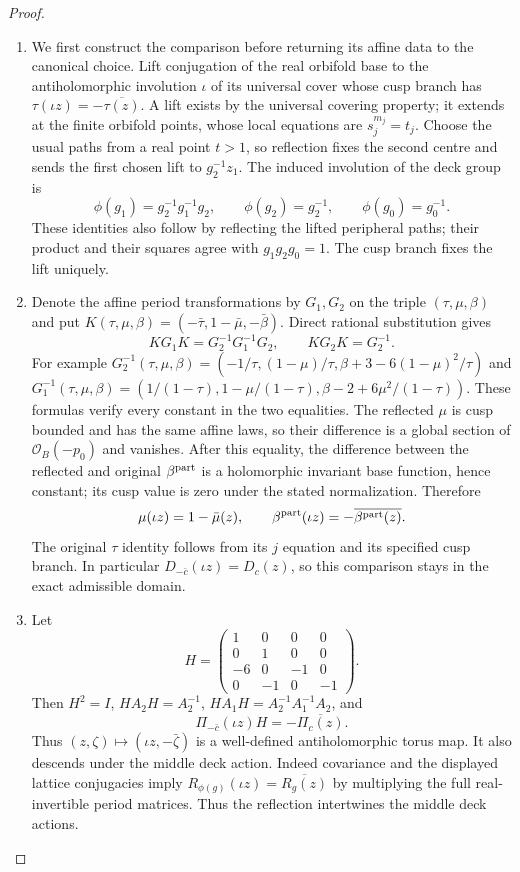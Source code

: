 \begin{proof}
\begin{enumerate}[label=\arabic*.,leftmargin=*]
\item We first construct the comparison before returning its affine data to the canonical choice. Lift conjugation of the real orbifold base to the antiholomorphic involution $\iota$ of its universal cover whose cusp branch has $\tau(\iota z)=-\overline{\tau(z)}$. A lift exists by the universal covering property; it extends at the finite orbifold points, whose local equations are $s_j^{m_j}=t_j$. Choose the usual paths from a real point $t>1$, so reflection fixes the second centre and sends the first chosen lift to $g_2^{-1}z_1$. The induced involution of the deck group is
\[
 \phi(g_1)=g_2^{-1}g_1^{-1}g_2,\qquad
 \phi(g_2)=g_2^{-1},\qquad \phi(g_0)=g_0^{-1}.
\]
These identities also follow by reflecting the lifted peripheral paths; their product and their squares agree with $g_1g_2g_0=1$. The cusp branch fixes the lift uniquely.

\item Denote the affine period transformations by $G_1,G_2$ on the triple $(\tau,\mu,\beta)$ and put $K(\tau,\mu,\beta)=(-\bar\tau,1-\bar\mu,-\bar\beta)$. Direct rational substitution gives
\[
 KG_1K=G_2^{-1}G_1^{-1}G_2,\qquad KG_2K=G_2^{-1}.
\]
For example $G_2^{-1}(\tau,\mu,\beta)=(-1/\tau,(1-\mu)/\tau,\beta+3-6(1-\mu)^2/\tau)$ and
$G_1^{-1}(\tau,\mu,\beta)=(1/(1-\tau),1-\mu/(1-\tau),\beta-2+6\mu^2/(1-\tau))$. These formulas verify every constant in the two equalities. The reflected $\mu$ is cusp bounded and has the same affine laws, so their difference is a global section of $\mathcal O_B(-p_0)$ and vanishes. After this equality, the difference between the reflected and original $\beta^{\rm part}$ is a holomorphic invariant base function, hence constant; its cusp value is zero under the stated normalization. Therefore
\[
 \mu(\iota z)=1-\bar\mu(z),\qquad
 \beta^{\rm part}(\iota z)=-\overline{\beta^{\rm part}(z)}.
\]
The original $\tau$ identity follows from its $j$ equation and its specified cusp branch. In particular $D_{-\bar c}(\iota z)=D_c(z)$, so this comparison stays in the exact admissible domain.

\item Let
\[
 H=\begin{pmatrix}1&0&0&0\\0&1&0&0\\-6&0&-1&0\\0&-1&0&-1\end{pmatrix}.
 \label{I:eq:real-reflection-matrix}
\]
Then $H^2=I$, $HA_2H=A_2^{-1}$, $HA_1H=A_2^{-1}A_1^{-1}A_2$, and
\[
 \Pi_{-\bar c}(\iota z)H=-\overline{\Pi_c(z)}.
\]
Thus $(z,\zeta)\mapsto(\iota z,-\bar\zeta)$ is a well-defined antiholomorphic torus map. It also descends under the middle deck action. Indeed covariance and the displayed lattice conjugacies imply $R_{\phi(g)}(\iota z)=\overline{R_g(z)}$ by multiplying the full real-invertible period matrices. Thus the reflection intertwines the middle deck actions.


\end{enumerate}
\end{proof}
